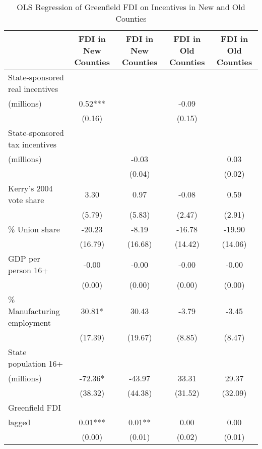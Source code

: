 \begin{table}[!htbp]\centering
\def\sym#1{\ifmmode^{#1}\else\(^{#1}\)\fi}
\caption{OLS Regression of Greenfield FDI on Incentives in New and Old Counties}
\begin{tabular}{l*{4}{c}}
\hline\hline
                    &FDI in New Counties   &FDI in New Counties   &FDI in Old Counties   &FDI in Old Counties   \\
\hline
State-sponsored real incentives \\ (millions)&        0.52***&               &       -0.09   &               \\
                    &      (0.16)   &               &      (0.15)   &               \\
State-sponsored tax incentives \\ (millions)&               &       -0.03   &               &        0.03   \\
                    &               &      (0.04)   &               &      (0.02)   \\
Kerry's 2004 vote share&        3.30   &        0.97   &       -0.08   &        0.59   \\
                    &      (5.79)   &      (5.83)   &      (2.47)   &      (2.91)   \\
\% Union share      &      -20.23   &       -8.19   &      -16.78   &      -19.90   \\
                    &     (16.79)   &     (16.68)   &     (14.42)   &     (14.06)   \\
GDP per person 16+  &       -0.00   &       -0.00   &       -0.00   &       -0.00   \\
                    &      (0.00)   &      (0.00)   &      (0.00)   &      (0.00)   \\
\% Manufacturing employment&       30.81*  &       30.43   &       -3.79   &       -3.45   \\
                    &     (17.39)   &     (19.67)   &      (8.85)   &      (8.47)   \\
 State population 16+ \\ (millions)&      -72.36*  &      -43.97   &       33.31   &       29.37   \\
                    &     (38.32)   &     (44.38)   &     (31.52)   &     (32.09)   \\
Greenfield FDI \\ lagged&        0.01***&        0.01** &        0.00   &        0.00   \\
                    &      (0.00)   &      (0.01)   &      (0.02)   &      (0.01)   \\

\end{tabular}
\end{table}
